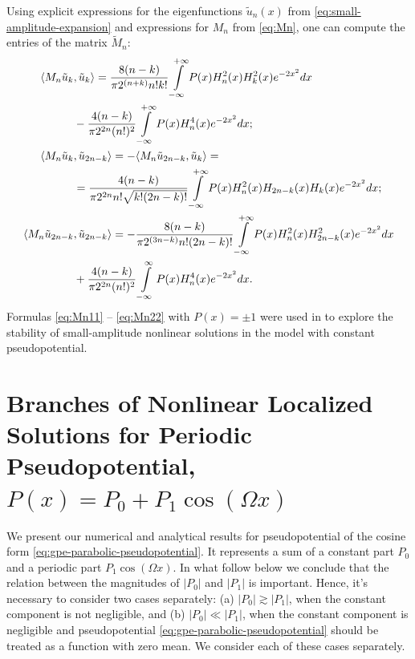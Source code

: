 Using explicit expressions for the eigenfunctions $\tilde{u}_n(x)$ from \eqref{eq:small-amplitude-expansion} and expressions for $M_n$ from \eqref{eq:Mn}, one can compute the entries of the matrix $\widetilde{M}_n$:
\begin{align}
\langle M_n \tilde{u}_k &, \tilde{u}_k \rangle = \frac{8(n-k)}{\pi 2^{(n+k)} n! k!} \int \limits_{-\infty }^{+\infty} P(x) H_n^2(x) H_k^2(x) e^{-2 x^2} dx \notag \\ & - \frac{4(n-k)}{\pi 2^{2n}(n!)^2} \int \limits_{-\infty }^{+\infty} P(x) H_n^4(x) e^{-2 x^2} dx; \label{eq:Mn11} \\
\langle M_n \tilde{u}_k &, \tilde{u}_{2n-k} \rangle = -\langle M_n \tilde{u}_{2n-k}, \tilde{u}_k \rangle = \notag \\ & = \frac{4 (n-k)}{\pi 2^{2n} n! \sqrt{k! (2n-k)!}} \int \limits_{-\infty}^{+\infty} P(x) H_n^2(x) H_{2n-k}(x) H_k(x) e^{-2 x^2} dx;  \label{eq:Mn12} \\
\langle M_n \tilde{u}_{2n-k} &, \tilde{u}_{2n-k} \rangle = -\frac{8(n-k)}{\pi 2^{(3n-k)} n! (2n-k)!} \int \limits_{-\infty}^{+\infty} P(x) H_n^2(x) H_{2n-k}^2(x) e^{-2 x^2} dx \notag \\ & + \frac{4(n-k)}{\pi 2^{2n} (n!)^2} \int \limits_{-\infty}^{\infty} P(x) H_n^4(x) e^{-2 x^2} dx. \label{eq:Mn22}
\end{align}
Formulas \eqref{eq:Mn11} -- \eqref{eq:Mn22} with $P(x) = \pm 1$ were used in \cite{ZezyulinAlfimovKonotopPerecGarcia2008} to explore the stability of small-amplitude nonlinear solutions in the model with constant pseudopotential.

\section{Branches of Nonlinear Localized Solutions for Periodic Pseudopotential, $P(x) = P_0 + P_1 \cos (\Omega x)$}

We present our numerical and analytical results for pseudopotential of the cosine form \eqref{eq:gpe-parabolic-pseudopotential}.
It represents a sum of a constant part $P_0$ and a periodic part $P_1 \cos (\Omega x)$.
In what follow below we conclude that the relation between the magnitudes of $|P_0|$ and $|P_1|$ is important.
Hence, it's necessary to consider two cases separately: (a) $|P_0| \gtrsim |P_1|$, when the constant component is not negligible, and (b) $|P_0| \ll |P_1|$, when the constant component is negligible and pseudopotential \eqref{eq:gpe-parabolic-pseudopotential} should be treated as a function with zero mean. 
We consider each of these cases separately.

